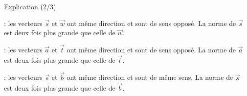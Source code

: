 \documentclass[border=4pt]{standalone}
\begin{document}
\begin{minipage}{16cm}\large \begin{minipage}{15.5cm}{\color{vert}\Large Explication (2/3)}\par{} : les vecteurs $\vec{s}$ et $\vec{w}$ ont même direction et sont de sens opposé. La norme de $\vec{s}$ est deux fois plus grande que celle de $\vec{w}$.\par{} : les vecteurs $\vec{a}$ et $\vec{t}$ ont même direction et sont de sens opposé. La norme de $\vec{a}$ est deux fois plus grande que celle de $\vec{t}$.\par{} : les vecteurs $\vec{s}$ et $\vec{b}$ ont même direction et sont de même sens. La norme de $\vec{s}$ est deux fois plus grande que celle de $\vec{b}$.\end{minipage}\end{minipage}
\end{document}
